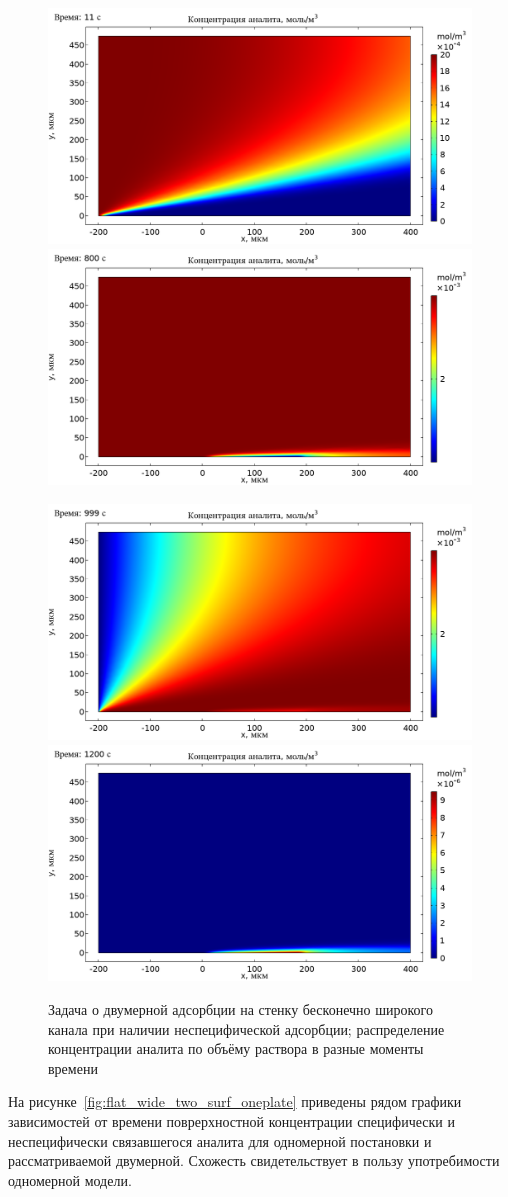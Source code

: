 \documentclass[oneside,final,12pt]{extreport}
\begin{document}
\begin{figure}
  \centering
  \includegraphics[width=.5\textwidth]{pic/flat_wide_twosurf_11s}%
  \includegraphics[width=.5\textwidth]{pic/flat_wide_twosurf_800s}

  \includegraphics[width=.5\textwidth]{pic/flat_wide_twosurf_999s}%
  \includegraphics[width=.5\textwidth]{pic/flat_wide_twosurf_1200s}

  \caption{%
    \label{fif:flat_wide_two_surf_concdistribs}%
    Задача о двумерной адсорбции на стенку бесконечно широкого канала
    при наличии неспецифической адсорбции;
    распределение концентрации аналита по объёму раствора в разные моменты времени
  }

\end{figure}

На рисунке~\ref{fig:flat_wide_two_surf_oneplate}
приведены рядом графики зависимостей от времени
поврерхностной концентрации специфически и неспецифически связавшегося аналита
для одномерной постановки и рассматриваемой двумерной.
Схожесть свидетельствует в пользу употребимости одномерной модели.
\end{document}
